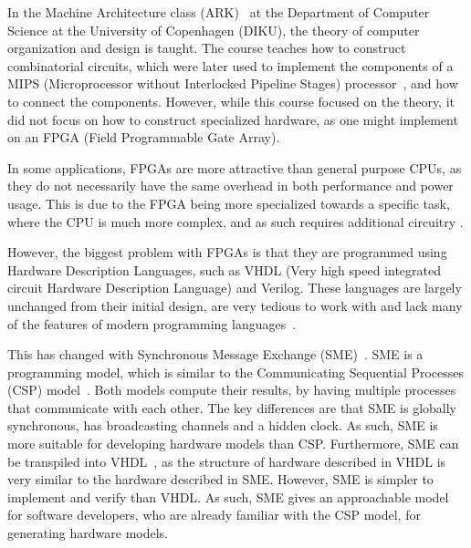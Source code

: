 %
%
%
%
%
%
%
%


In the Machine Architecture class (ARK)~\cite{ref:ark} at the Department of
Computer Science at the University of Copenhagen (DIKU), the
theory of computer organization and design is taught. The course teaches how to
construct combinatorial circuits, which were later used to implement the
components of a MIPS (Microprocessor without Interlocked Pipeline Stages)
processor~\cite{ref:ark-book}, and how to connect the components. However, while
this course focused on the theory, it did not focus on how to construct
specialized hardware, as one might implement on an FPGA (Field Programmable
Gate Array).

In some applications, FPGAs are more attractive than general purpose CPUs, as
they do not necessarily have the same overhead in both performance and power
usage. This is due to the FPGA being more specialized towards a specific task,
where the CPU is much more complex, and as such requires additional circuitry
\cite{ref:sme-cs}.

However, the biggest problem with FPGAs is that they are programmed using
Hardware Description Languages, such as VHDL (Very high speed integrated
circuit Hardware Description Language) and Verilog. These languages are largely
unchanged from their initial design, are very tedious to work with and lack
many of the features of modern programming languages~\cite{ref:sme-cs}.

This has changed with Synchronous Message Exchange (SME)~\cite{ref:sme-cs,
ref:sme1, ref:sme2}. SME is a programming model, which is similar to the
Communicating Sequential Processes (CSP) model~\cite{ref:csp}. Both models
compute their results, by having multiple processes that communicate with each
other. The key differences are that SME is globally synchronous, has
broadcasting channels and a hidden clock. As such, SME is more suitable for
developing hardware models than CSP. Furthermore, SME can be transpiled into
VHDL~\cite{ref:sme-vhdl}, as the structure of hardware described in VHDL is
very similar to the hardware described in SME. However, SME is simpler to
implement and verify than VHDL. As such, SME gives an approachable model for
software developers, who are already familiar with the CSP model, for
generating hardware models.

